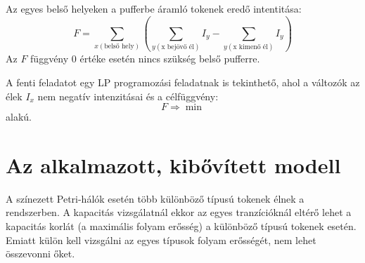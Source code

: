 Az egyes belső helyeken a pufferbe áramló tokenek  eredő intentitása:
$$F= \sum_{x(\text{belső hely})} \left( \sum_{y(\text{x bejövő él})} I_y - \sum_{y(\text{x kimenő él})} I_y \right)$$
Az $F$ függvény 0 értéke esetén nincs szükség belső pufferre.

A fenti feladatot egy LP programozási feladatnak is tekinthető, ahol a változók az élek $I_x$ nem negatív intenzitásai és a célfüggvény:
$$F\Rightarrow \min$$ alakú.

\section{Az alkalmazott, kibővített modell}

A színezett Petri-hálók esetén több különböző típusú tokenek élnek a rendszerben. A kapacitás vizsgálatnál ekkor az egyes tranzícióknál eltérő lehet a kapacitás korlát (a maximális folyam erősség) a különböző típusú tokenek esetén. Emiatt külön kell vizsgálni az egyes típusok folyam erősségét, nem lehet összevonni őket.

